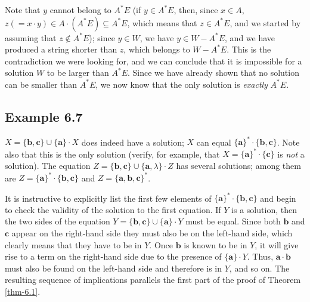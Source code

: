 \begin{thm}
Note that $y$ cannot belong to $A^*E$ (if $y \in A^*E$, then, since $x \in A$,
$z(=x\cdot y)\in A \cdot (A^*E) \subseteq A^*E$, which means that $z \in A^*E$,
and we started by assuming that $z \not \in A^*E$); since $y \in W$, we have 
$y \in W - A^*E$, and we have produced a string shorter than $z$, which belongs
to $W - A^*E$. This is the contradiction we were looking for, and we can
conclude that it is impossible for a solution $W$ to be larger than $A^*E$.
Since we have already shown that no solution can be smaller than $A^*E$, we now
know that the only solution is \emph{exactly} $A^*E$.
\end{thm}

\subsection*{Example 6.7}

$X=\{\pmb{b},\pmb{c}\} \cup \{\pmb{a}\} \cdot X$ does indeed have a solution;
$X$ can equal $\{\pmb{a}\}^*  \cdot \{\pmb{b},\pmb{c}\}$. Note also that this is
the only solution (verify, for example, that $X=\{\pmb{a}\}^*  \cdot\{\pmb{c}\}$
is \emph{not} a solution). The equation $Z=\{\pmb{b},\pmb{c}\}\cup\{\pmb{a},\lambda\}
\cdot Z$ has several solutions; among them are $Z=\{\pmb{a}\}^*  \cdot\{\pmb{b},
\pmb{c}\}$ and $Z=\{\pmb{a},\pmb{b},\pmb{c}\}^*$.

It is instructive to explicitly list the first few elements of $\{\pmb{a}\}^*
  \cdot\{\pmb{b},\pmb{c}\}$ and begin to check the validity of the solution to the
first equation. If $Y$ is a solution, then the two sides of the equation
$Y=\{\pmb{b},\pmb{c}\}\cup\{\pmb{a}\}\cdot Y$ must be equal. Since both $\pmb{b}$
and $\pmb{c}$ appear on the right-hand side they must also be on the left-hand
side, which clearly means that they have to be in $Y$. Once $\pmb{b}$ is known to
be in $Y$, it will give rise to a term on the right-hand side due to the
presence of $\{\pmb{a}\}\cdot Y$. Thus, $\pmb{a}\cdot\pmb{b}$ must also be found
on the left-hand side and therefore is in $Y$, and so on. The resulting sequence
of implications parallels the first part of the proof of Theorem \ref{thm-6.1}.


